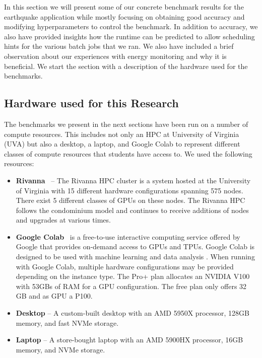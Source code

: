 \documentclass[utf8]{FrontiersinVancouver} %
\begin{document}
In this section we will present some of our concrete benchmark results for the earthquake application while mostly focusing on obtaining good accuracy and modifying hyperparameters to control the benchmark. In addition to accuracy, we also have provided insights how the runtime can be predicted to allow scheduling hints for the various batch jobs that we ran. We also have included a brief observation about our experiences with energy monitoring and why it is beneficial. We start the section with a description of the hardware used for the benchmarks.


\subsection{Hardware used for this Research}

The benchmarks we present in the next sections have been run on a number of compute resources. This includes not only an HPC at University of Virginia (UVA) but also a desktop, a laptop, and Google Colab to represent different classes of compute resources that students have access to. We used the following resources:

\begin{itemize}
\item {\bf Rivanna}~\citep{www-rivanna} -- The Rivanna HPC cluster is a system hosted at the University of Virginia
with 15 different hardware configurations spanning 575 nodes. 
There exist 5 different classes of GPUs on these nodes. The Rivanna HPC follows the condominium model and continues to receive additions of nodes and upgrades at various times.
\item {\bf Google Colab}~\cite{google-colab} is a free-to-use interactive computing service offered by Google that provides on-demand access to GPUs and TPUs. Google Colab is designed to be used with machine learning and data analysis \cite{google-colab}.
When running with Google Colab, multiple hardware configurations may be provided depending on the instance type. The Pro+ plan allocates an NVIDIA V100 with 53GBs of RAM for a GPU configuration. The free plan only offers 32 GB and as GPU a P100.
\item {\bf Desktop} -- A custom-built desktop with an AMD 5950X processor, 128GB memory, and fast NVMe storage.
\item {\bf Laptop} -- A store-bought laptop with an AMD 5900HX processor, 16GB memory, and NVMe storage.

\end{itemize}
\end{document}
